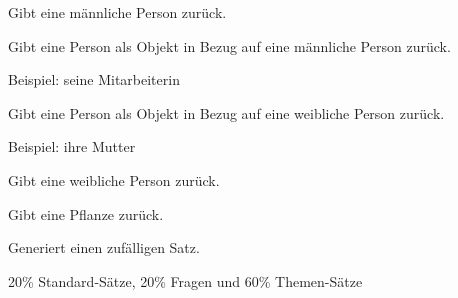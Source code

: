 \documentclass[a4paper,12pt,oneside]{sphinxmanual}
\begin{document}

\begin{fulllineitems}
\label{funktionen:pyzufall.person_m}
Gibt eine männliche Person zurück.

\end{fulllineitems}


\begin{fulllineitems}
\label{funktionen:pyzufall.person_objekt_m}
Gibt eine Person als Objekt in Bezug auf eine männliche Person zurück.

Beispiel: seine Mitarbeiterin

\end{fulllineitems}


\begin{fulllineitems}
\label{funktionen:pyzufall.person_objekt_w}
Gibt eine Person als Objekt in Bezug auf eine weibliche Person zurück.

Beispiel: ihre Mutter

\end{fulllineitems}


\begin{fulllineitems}
\label{funktionen:pyzufall.person_w}
Gibt eine weibliche Person zurück.

\end{fulllineitems}


\begin{fulllineitems}
\label{funktionen:pyzufall.pflanze}
Gibt eine Pflanze zurück.

\end{fulllineitems}


\begin{fulllineitems}
\label{funktionen:pyzufall.satz}
Generiert einen zufälligen Satz.

20\% Standard-Sätze, 20\% Fragen und 60\% Themen-Sätze

\end{fulllineitems}
\end{document}
